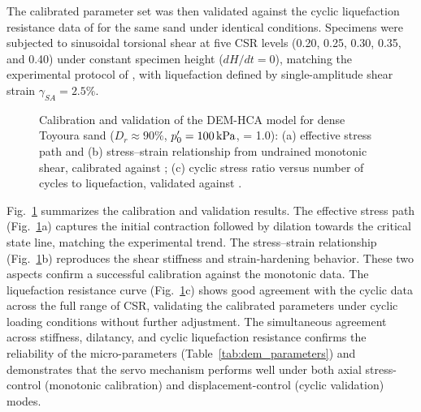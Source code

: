 The calibrated parameter set was then validated against the cyclic liquefaction resistance data of \citet{Ishihara1985} for the same sand under identical conditions. Specimens were subjected to sinusoidal torsional shear at five CSR levels (0.20, 0.25, 0.30, 0.35, and 0.40) under constant specimen height ($dH/dt=0$), matching the experimental protocol of \citet{Ishihara1985}, with liquefaction defined by single-amplitude shear strain $\gamma_{SA}=2.5\%$.

\begin{figure}[t]
  \centering
  \caption{Calibration and validation of the DEM-HCA model for dense Toyoura sand ($D_r \approx 90\%$, $p^\prime_0=\SI{100}{kPa}$, \Kzero{} = 1.0): (a) effective stress path and (b) stress--strain relationship from undrained monotonic shear, calibrated against \citet{Nakata1998}; (c) cyclic stress ratio versus number of cycles to liquefaction, validated against \citet{Ishihara1985}.}
  \label{fig:validation_combined}
\end{figure}

Fig.~\ref{fig:validation_combined} summarizes the calibration and validation results. The effective stress path (Fig.~\ref{fig:validation_combined}a) captures the initial contraction followed by dilation towards the critical state line, matching the experimental trend. The stress--strain relationship (Fig.~\ref{fig:validation_combined}b) reproduces the shear stiffness and strain-hardening behavior. These two aspects confirm a successful calibration against the monotonic data. The liquefaction resistance curve (Fig.~\ref{fig:validation_combined}c) shows good agreement with the cyclic data across the full range of CSR, validating the calibrated parameters under cyclic loading conditions without further adjustment. The simultaneous agreement across stiffness, dilatancy, and cyclic liquefaction resistance confirms the reliability of the micro-parameters (Table~\ref{tab:dem_parameters}) and demonstrates that the servo mechanism performs well under both axial stress-control (monotonic calibration) and displacement-control (cyclic validation) modes.


